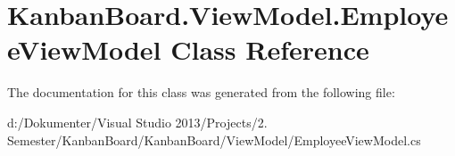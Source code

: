 \hypertarget{class_kanban_board_1_1_view_model_1_1_employee_view_model}{}\section{Kanban\+Board.\+View\+Model.\+Employee\+View\+Model Class Reference}
\label{class_kanban_board_1_1_view_model_1_1_employee_view_model}


The documentation for this class was generated from the following file\+:\begin{DoxyCompactItemize}
\item 
d\+:/\+Dokumenter/\+Visual Studio 2013/\+Projects/2. Semester/\+Kanban\+Board/\+Kanban\+Board/\+View\+Model/Employee\+View\+Model.\+cs\end{DoxyCompactItemize}
